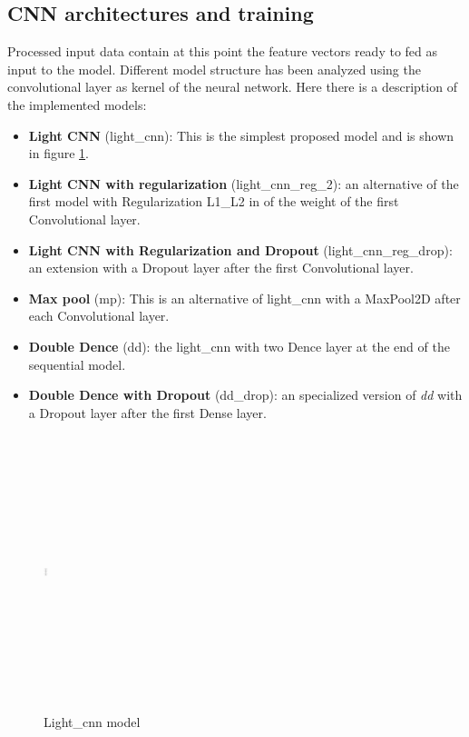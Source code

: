 \subsection*{\textbf {CNN architectures and training}}Processed input data contain at this point the feature vectors ready to fed as input to the model. Different model structure has been analyzed using the convolutional layer as kernel of the neural network. Here there is a description of the implemented models:
\begin{itemize}
	\item \textbf{Light CNN} (light\_cnn): This is the simplest proposed model and is shown in figure \ref{fig:CNN_schema}.
	\item \textbf{Light CNN with regularization} (light\_cnn\_reg\_2): an alternative of the first model with Regularization L1\_L2 in of the weight of the first Convolutional layer.
	\item \textbf{Light CNN with Regularization and Dropout} (light\_cnn\_reg\_drop): an extension with a Dropout layer after the first Convolutional layer.
	\item \textbf{Max pool} (mp): This is an alternative of light\_cnn with a MaxPool2D after each Convolutional layer.
	\item \textbf{Double Dence} (dd): the light\_cnn with two Dence layer at the end of the sequential model.
	\item \textbf{Double Dence with Dropout} (dd\_drop): an specialized version of \textit{dd} with a Dropout layer after the first Dense layer.
\end{itemize}
\begin{figure}[h]
	\centering
	\includegraphics[width=5, height=8cm, width=0.25\textwidth]{CNN_schema}
	\caption{Light\_cnn model}
	\label{fig:CNN_schema}
\end{figure} 
